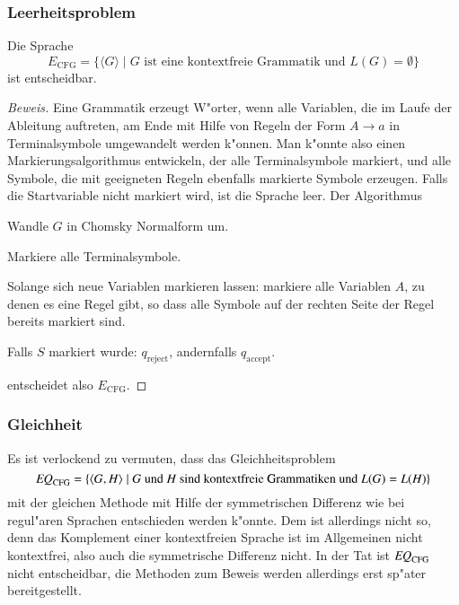 \subsubsection{Leerheitsproblem}
\begin{satz}
Die Sprache
\[
E_{\text{CFG}}=\{
\langle G\rangle\;|\; \text{$G$ ist eine kontextfreie Grammatik und $L(G)=\emptyset$}
\}
\]
ist entscheidbar.
\end{satz}

\begin{proof}[Beweis]
Eine Grammatik erzeugt W"orter, wenn alle Variablen, die im Laufe
der Ableitung auftreten, am Ende mit Hilfe von Regeln der Form $A\to a$
in Terminalsymbole umgewandelt werden k"onnen. Man k"onnte also einen
Markierungsalgorithmus entwickeln, der alle Terminalsymbole markiert,
und alle Symbole, die mit geeigneten Regeln ebenfalls markierte Symbole
erzeugen. Falls die Startvariable nicht markiert wird, ist die Sprache
leer. Der Algorithmus 
\medskip
\begin{compactenum}
\item Wandle $G$ in Chomsky Normalform um.
\item Markiere alle Terminalsymbole.
\item Solange sich neue Variablen markieren lassen: markiere alle
Variablen $A$, zu denen es eine Regel gibt, so dass alle Symbole auf
der rechten Seite der Regel bereits markiert sind.
\item Falls $S$ markiert wurde: $q_{\text{reject}}$, andernfalls
$q_{\text{accept}}$.
\end{compactenum}
\medskip
entscheidet also
$E_{\text{CFG}}$.
\end{proof}

\subsubsection{Gleichheit}
Es ist verlockend zu vermuten, dass das Gleichheitsproblem
\[
\text{\it EQ}_{\text{CFG}}=\{
\langle G,H\rangle\;|\; \text{$G$  und $H$ sind kontextfreie Grammatiken und $L(G)=L(H)$}
\}
\]
mit der gleichen Methode mit Hilfe der symmetrischen Differenz
wie bei regul"aren Sprachen entschieden werden k"onnte. Dem ist
allerdings nicht so, denn das Komplement einer kontextfreien Sprache
ist im Allgemeinen nicht kontextfrei, also auch die symmetrische
Differenz nicht. In der Tat ist 
$\text{\it EQ}_{\text{CFG}}$ nicht entscheidbar, die Methoden zum Beweis
werden allerdings erst sp"ater bereitgestellt.

